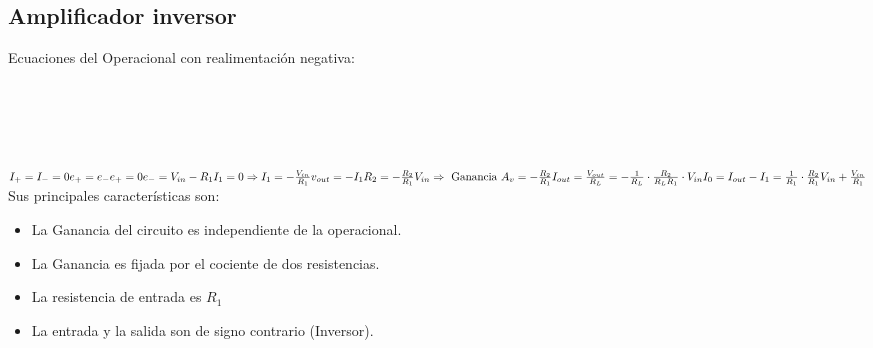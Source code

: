 \documentclass[12pt,spanish,lettersize]{article}
\begin{document}
\subsection{Amplificador inversor}
Ecuaciones del Operacional con realimentaci\'on negativa:
\\ \\ \\ \\ \\ \\
\begin{math}
\\
I_{+} = I_{-} = 0\\
e_{+} = e_{-}\\
e_{+} = 0\\
e_{-} = V_{in}-R_{1}I_{1}=0 \Rightarrow I_{1} = -\frac{V_{in}}{R_{1}}\\
v_{out}=-I_{1}R_{2}=-\frac{R_{2}}{R_{1}}V_{in}\Rightarrow\textup{ Ganancia } A_{v} = -\frac{R_{2}}{R_{1}}\\
I_{out} = \frac{V_{out}}{R_{L}}=-\frac{1}{R_{L}}\cdot\frac{R_{2}}{R_{L}R_{1}}\cdot V_{in}\\
I_{0} = I_{out}-I_{1} = \frac{1}{R_{1}}\cdot\frac{R_{2}}{R_{1}}V_{in}+\frac{V_{in}}{R_{1}}
\end{math}\\
Sus principales caracter\'isticas son:\\
\begin{itemize}
\item La Ganancia del circuito es independiente de la operacional.
\item La Ganancia es fijada por el cociente de dos resistencias.
\item La resistencia de entrada es $R_{1}$
\item La entrada y la salida son de signo contrario (Inversor).
\end{itemize}
\end{document}

